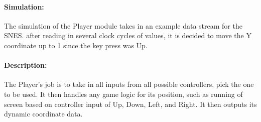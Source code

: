 \documentclass[]{article}
\begin{document}
\paragraph{Simulation:} The simulation of the Player module takes in an example data stream for the SNES.
after reading in several clock cycles of values, it is decided to move the Y coordinate up to 1 since the key press was Up.
\paragraph{Description:} The Player's job is to take in all inputs from all possible controllers, pick the one to be used. It then handles any game logic for its position,
such as running of screen based on controller input of Up, Down, Left, and Right. It then outputs its dynamic coordinate data.
\end{document}
